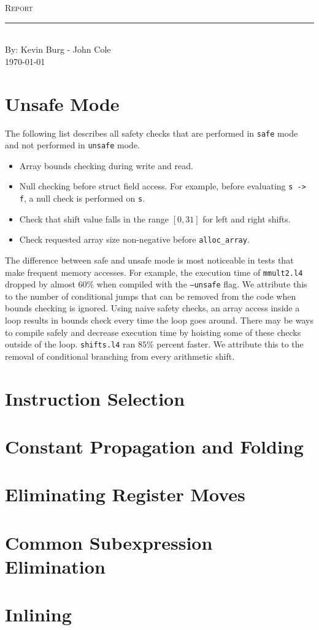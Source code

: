 \documentclass[aps,letterpaper,11pt]{revtex4}
\newcommand{\labtitle}{Report}
\newcommand{\authorname}{Kevin Burg - John Cole}
\begin{document}

\begin{titlepage}
\begin{center}
{\Large \textsc{\labtitle} \\ \vspace{4pt}} 
\rule[13pt]{\textwidth}{1pt} \\ \vspace{150pt}
{\large By: \authorname \\ \vspace{10pt}
\today}
\end{center}
\end{titlepage}


\section{Unsafe Mode}

The following list describes all safety checks that are performed in \texttt{safe} mode and not performed in
\texttt{unsafe} mode.

\begin{itemize}
\item Array bounds checking during write and read.
\item Null checking before struct field access. For example, before evaluating \texttt{s -> f}, a null check
is performed on \texttt{s}.
\item Check that shift value falls in the range $[0, 31]$ for left and right shifts.
\item Check requested array size non-negative before \texttt{alloc\_array}.
\end{itemize}

The difference between safe and unsafe mode is most noticeable in tests that make frequent memory accesses.
For example, the execution time of \texttt{mmult2.l4} dropped by almost $60\%$ when compiled with the
\texttt{--unsafe} flag. We attribute this to the number of conditional jumps that can be removed from the
code when bounds checking is ignored. Using naive safety checks, an array access inside a loop results in
bounds check every time the loop goes around. There may be ways to compile safely and decrease execution
time by hoisting some of these checks outside of the loop. \texttt{shifts.l4} ran $85\%$ percent faster.
We attribute this to the removal of conditional branching from every arithmetic shift.

\section{Instruction Selection}


\section{Constant Propagation and Folding}


\section{Eliminating Register Moves}


\section{Common Subexpression Elimination}


\section{Inlining}
\end{document}
